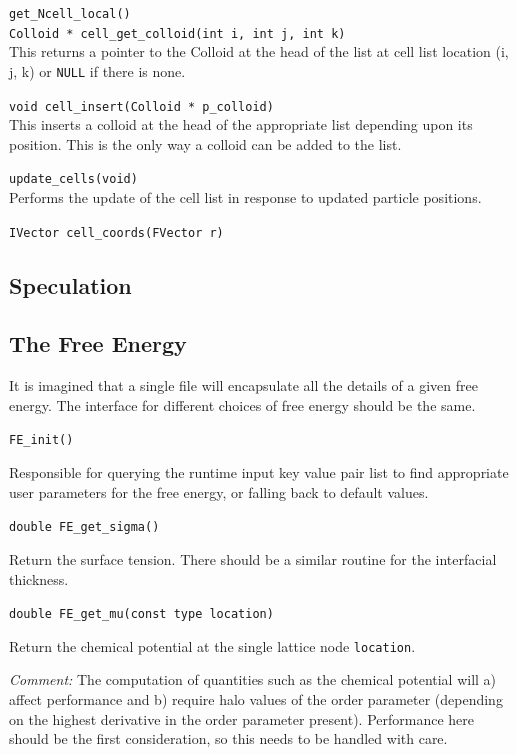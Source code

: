 \texttt{get\_Ncell\_local()}\\

\texttt{Colloid * cell\_get\_colloid(int i, int j, int k)}\\
This returns a pointer to the Colloid at the head of the list at
cell list location (i, j, k) or \texttt{NULL} if there is none.

\texttt{void cell\_insert(Colloid * p\_colloid)}\\
This inserts a colloid at the head of the appropriate list
depending upon its position. This is the only way a colloid
can be added to the list.

\texttt{update\_cells(void)}\\
Performs the update of the cell list in response to updated
particle positions.

\texttt{IVector cell\_coords(FVector r)}\\




\subsection{Speculation}

\subsection{The Free Energy}

It is imagined that a single file will encapsulate all the details
of a given free energy. The interface for different choices of
free energy should be the same.


\texttt{FE\_init()}

Responsible for querying the runtime input key value pair list to
find appropriate user parameters for the free energy, or
falling back to default values.


\texttt{double FE\_get\_sigma()}

Return the surface tension. There should be a similar routine
for the interfacial thickness.

\texttt{double FE\_get\_mu(const type location)}

Return the chemical potential at the single lattice
node \texttt{location}.

\textit{Comment:} The computation of quantities such as the chemical
potential will a) affect performance and b) require halo values of
the order parameter (depending on the highest derivative
in the order parameter present). Performance here should be the
first consideration, so this needs to be handled with care.


